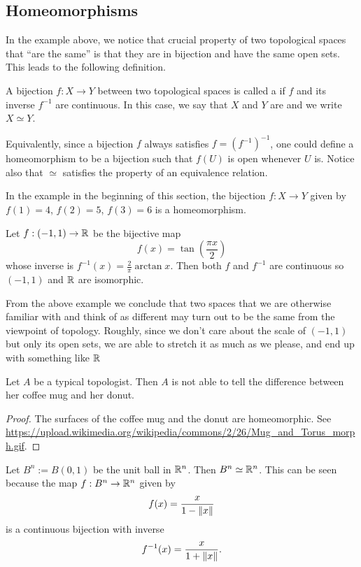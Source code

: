 \subsection{Homeomorphisms}
In the example above, we notice that crucial property of two topological spaces that ``are the same'' is that they are in bijection and have the same open sets. This leads to the following definition.
\begin{defn}
  A bijection $f : X \to Y$ between two topological spaces is called a  if $f$ and its inverse $f^{-1}$ are continuous. In this case, we say that $X$ and $Y$ are  and we write $X \simeq Y$.
\end{defn}
Equivalently, since a bijection $f$ always satisfies $f = (f^{-1})^{-1}$, one could define a homeomorphism to be a bijection such that $f(U)$ is open whenever $U$ is. Notice also that $\simeq$ satisfies the property of an equivalence relation.
\begin{example}
  In the example in the beginning of this section, the bijection $f : X \to Y$ given by $f(1) = 4$, $f(2) = 5$, $f(3) = 6$ is a homeomorphism.
\end{example}
\begin{example}
  Let $f : (-1 , 1) \to \mathbb{R}$ be the bijective map
  \[
    f(x) = \tan \left( \frac{\pi x}{2} \right)
  \]
  whose inverse is $f^{-1}(x) = \tfrac{2}{\pi} \arctan x$. Then both $f$ and $f^{-1}$ are continuous so $(-1,1)$ and $\mathbb{R}$ are isomorphic.
\end{example}
From the above example we conclude that two spaces that we are otherwise familiar with and think of as different may turn out to be the same from the viewpoint of topology. Roughly, since we don't care about the scale of $(-1,1)$ but only its open sets, we are able to stretch it as much as we please, and end up with something like $\mathbb{R}$
\begin{badjoke}
  Let $A$ be a typical topologist. Then $A$ is not able to tell the difference between her coffee mug and her donut.
\end{badjoke}
\begin{proof}
  The surfaces of the coffee mug and the donut are homeomorphic. See \url{https://upload.wikimedia.org/wikipedia/commons/2/26/Mug_and_Torus_morph.gif}.
\end{proof}
\begin{example}
  \label{open-ball-homeomorphism}
  Let $B^n := B(0,1)$ be the unit ball in $\mathbb{R}^n$. Then $B^n \simeq \mathbb{R}^n$. This can be seen because the map $f : B^n \to \mathbb{R}^n$ given by
  \[
    f(x) = \frac{x}{1-\lVert x \rVert}
  \]
  is a continuous bijection with inverse
  \[
    f^{-1}(x) = \frac{x}{1+\lVert x \rVert}.
  \]
\end{example}
